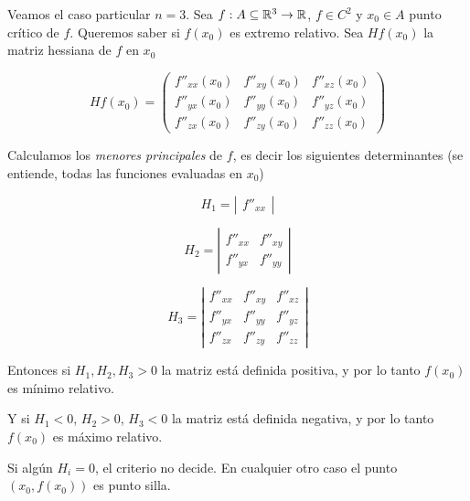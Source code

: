 \begin{example}
Veamos el caso particular $n=3$.  Sea $f : A \subseteq \mathbb{R}^3 \to \mathbb{R}$, $f \in C^2$ y $x_0 \in A$ punto crítico de $f$.  Queremos saber si $f(x_0)$ es extremo relativo. Sea $Hf(x_0)$ la matriz hessiana de $f$ en $x_0$

$$ Hf(x_0) = \begin{pmatrix} f''_{xx}(x_0) & f''_{xy}(x_0) & f''_{xz}(x_0) \\ f''_{yx}(x_0) & f''_{yy}(x_0) & f''_{yz}(x_0) \\ f''_{zx}(x_0) & f''_{zy}(x_0) & f''_{zz}(x_0) \end{pmatrix} $$

Calculamos los \emph{menores principales} de $f$, es decir los siguientes determinantes (se entiende, todas las funciones evaluadas en $x_0$) 

$$ H_1 = \left| \begin{matrix} f''_{xx} \end{matrix} \right| $$

$$ H_2 = \left| \begin{matrix} f''_{xx} & f''_{xy} \\ f''_{yx} & f''_{yy} \end{matrix} \right| $$

$$ H_3 = \left| \begin{matrix} f''_{xx} & f''_{xy} & f''_{xz} \\ f''_{yx} & f''_{yy} & f''_{yz} \\ f''_{zx} & f''_{zy} & f''_{zz} \end{matrix} \right| $$

Entonces si $H_1, H_2, H_3 > 0$ la matriz está definida positiva, y por lo tanto $f(x_0)$ es mínimo relativo.

Y si $H_1 < 0$, $ H_2 > 0$, $H_3 < 0$ la matriz está definida negativa, y por lo tanto $f(x_0)$ es máximo relativo.

Si algún $H_i = 0$, el criterio no decide.  En cualquier otro caso el punto $(x_0, f(x_0))$ es punto silla.
\end{example}

